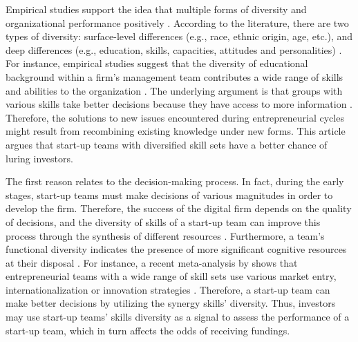 \documentclass[12pt]{article}
\begin{document}
Empirical studies support the idea that multiple forms of diversity and organizational performance positively \citep{zhou2015entrepreneurial}. According to the literature, there are two types of diversity: surface-level differences (e.g., race, ethnic origin, age, etc.), and deep differences (e.g., education, skills, capacities, attitudes and personalities) \citep{bell2007deep}. For instance, empirical studies suggest that the diversity of educational background within a firm's management team contributes a wide range of skills and abilities to the organization \citep{beckman2007early, zarutskie2010role}. The underlying argument is that groups with various skills take better decisions because they have access to more information \citep{hong2001problem}. Therefore, the solutions to new issues encountered during entrepreneurial cycles might result from recombining existing knowledge under new forms. This article argues that start-up teams with diversified skill sets have a better chance of luring investors.

The first reason relates to the decision-making process. In fact, during the early stages, start-up teams must make decisions of various magnitudes in order to develop the firm. Therefore, the success of the digital firm depends on the quality of decisions, and the diversity of skills of a start-up team can improve this process through the synthesis of different resources \citep{sirmon2011resource}. Furthermore, a team's functional diversity indicates the presence of more significant cognitive resources at their disposal \citep{bunderson2002comparing}. For instance, a recent meta-analysis by \citet{jin2017entrepreneurial} shows that entrepreneurial teams with a wide range of skill sets use various market entry, internationalization or innovation strategies \citep{boeker1989strategic}. Therefore, a start-up team can make better decisions by utilizing the synergy skills' diversity. Thus, investors may use start-up teams' skills diversity as a signal to assess the performance of a start-up team, which in turn affects the odds of receiving fundings.
\end{document}
